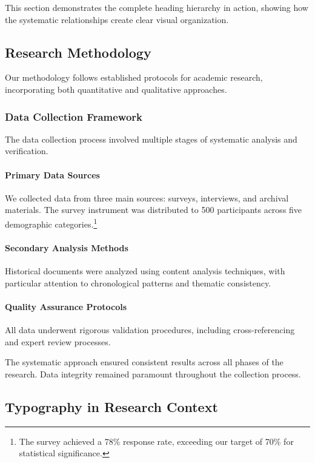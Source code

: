 \documentclass[11pt]{article}
\begin{document}
This section demonstrates the complete heading hierarchy in action, showing how the systematic relationships create clear visual organization.

\subsection{Research Methodology}

Our methodology follows established protocols for academic research, incorporating both quantitative and qualitative approaches.

\subsubsection{Data Collection Framework}

The data collection process involved multiple stages of systematic analysis and verification.

\paragraph{Primary Data Sources} We collected data from three main sources: surveys, interviews, and archival materials. The survey instrument was distributed to 500 participants across five demographic categories.\footnote{The survey achieved a 78\% response rate, exceeding our target of 70\% for statistical significance.}

\paragraph{Secondary Analysis Methods} Historical documents were analyzed using content analysis techniques, with particular attention to chronological patterns and thematic consistency.

\paragraph{Quality Assurance Protocols} All data underwent rigorous validation procedures, including cross-referencing and expert review processes.

The systematic approach ensured consistent results across all phases of the research. Data integrity remained paramount throughout the collection process.

\subsection{Typography in Research Context}
\end{document}

